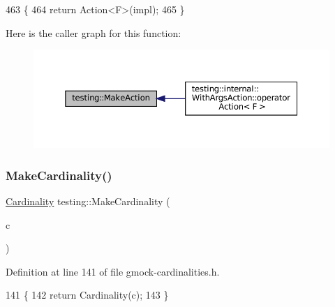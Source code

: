 \begin{DoxyCode}
463                                                \{
464   \textcolor{keywordflow}{return} Action<F>(impl);
465 \}
\end{DoxyCode}
Here is the caller graph for this function\+:
\nopagebreak
\begin{figure}[H]
\begin{center}
\leavevmode
\includegraphics[width=350pt]{namespacetesting_ae6b9960db2b2685e043ce5215291f5b8_icgraph}
\end{center}
\end{figure}
\mbox{\label{namespacetesting_af567006969875ab70fc6aa3029576774}} 
\subsubsection{\texorpdfstring{Make\+Cardinality()}{MakeCardinality()}}
{\footnotesize\ttfamily \hyperlink{classtesting_1_1Cardinality}{Cardinality} testing\+::\+Make\+Cardinality (\begin{DoxyParamCaption}\item[{const \hyperlink{classtesting_1_1CardinalityInterface}{Cardinality\+Interface} $\ast$}]{c }\end{DoxyParamCaption})\hspace{0.3cm}{\ttfamily [inline]}}



Definition at line 141 of file gmock-\/cardinalities.\+h.


\begin{DoxyCode}
141                                                                   \{
142   \textcolor{keywordflow}{return} Cardinality(c);
143 \}
\end{DoxyCode}
\mbox{\label{namespacetesting_a37fd8029ac00e60952440a3d9cca8166}} 
